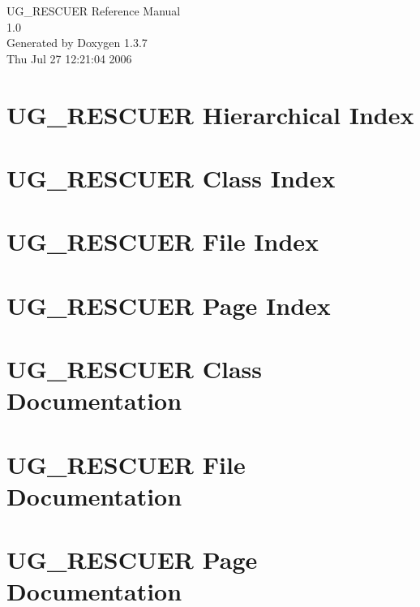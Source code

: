 \documentclass[a4paper]{book}
\begin{document}
\begin{titlepage}
\vspace*{7cm}
\begin{center}
{\Large UG\_\-RESCUER Reference Manual\\[1ex]\large 1.0 }\\
\vspace*{1cm}
{\large Generated by Doxygen 1.3.7}\\
\vspace*{0.5cm}
{\small Thu Jul 27 12:21:04 2006}\\
\end{center}
\end{titlepage}
\clearemptydoublepage
{}
\tableofcontents
\clearemptydoublepage
{}
\chapter{UG\_\-RESCUER Hierarchical Index}

\chapter{UG\_\-RESCUER Class Index}

\chapter{UG\_\-RESCUER File Index}

\chapter{UG\_\-RESCUER Page Index}

\chapter{UG\_\-RESCUER Class Documentation}






\chapter{UG\_\-RESCUER File Documentation}













\chapter{UG\_\-RESCUER Page Documentation}

\printindex
\end{document}
